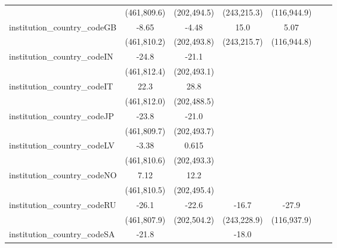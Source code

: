 \begin{tabular}{lcccccc}
                                         & (461,809.6)   & (202,494.5)   & (243,215.3)   & (116,944.9)   &            &   \\   
   institution\_country\_codeGB          & -8.65         & -4.48         & 15.0          & 5.07          &            &   \\   
                                         & (461,810.2)   & (202,493.8)   & (243,215.7)   & (116,944.8)   &            &   \\   
   institution\_country\_codeIN          & -24.8         & -21.1         &               &               &            &   \\   
                                         & (461,812.4)   & (202,493.1)   &               &               &            &   \\   
   institution\_country\_codeIT          & 22.3          & 28.8          &               &               &            &   \\   
                                         & (461,812.0)   & (202,488.5)   &               &               &            &   \\   
   institution\_country\_codeJP          & -23.8         & -21.0         &               &               &            &   \\   
                                         & (461,809.7)   & (202,493.7)   &               &               &            &   \\   
   institution\_country\_codeLV          & -3.38         & 0.615         &               &               &            &   \\   
                                         & (461,810.6)   & (202,493.3)   &               &               &            &   \\   
   institution\_country\_codeNO          & 7.12          & 12.2          &               &               &            &   \\   
                                         & (461,810.5)   & (202,495.4)   &               &               &            &   \\   
   institution\_country\_codeRU          & -26.1         & -22.6         & -16.7         & -27.9         &            &   \\   
                                         & (461,807.9)   & (202,504.2)   & (243,228.9)   & (116,937.9)   &            &   \\   
   institution\_country\_codeSA          & -21.8         &               & -18.0         &               &            &   \\   

\end{tabular}
